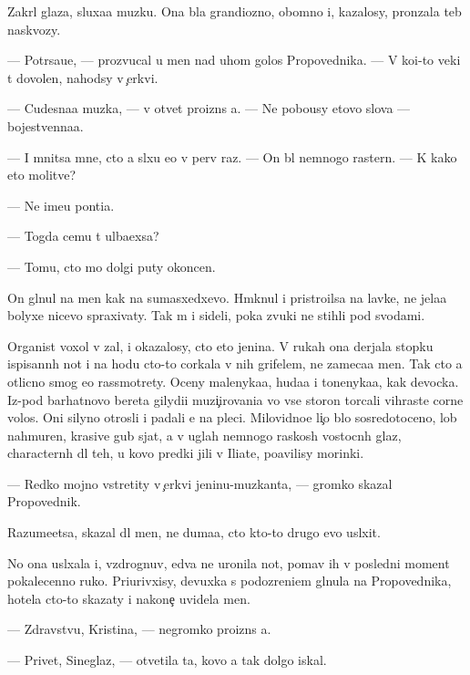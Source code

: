 \documentclass[10pt]{book}
\begin{document}
Zakr{\yi}l glaza, sluxa{\y}a muz{\yi}ku. Ona b{\yi}la grandiozno{\y}, ob{\y}omno{\y} i, kazalosy, pronzala teb{\ia} naskvozy.

— Potr{\ia}sa{\y}u{\x}e, — prozvucal u men{\ia} nad uhom golos Pro\-po\-ved\-nika. — V ko{\y}i-to veki t{\yi} do\-vo\-len, nahod{\ia}sy v {\c}erkvi.

— Cudesna{\y}a muz{\yi}ka, — v otvet proizn{\e}s {\y}a. — Ne pobo{\y}usy etovo slova — bojestvenna{\y}a.

— I mnitsa mne, cto {\y}a sl{\yi}xu {\y}e{\y}o v perv{\yi}{\y} raz. — On b{\yi}l nemnogo raster{\ia}n. — K kako{\y} eto molitve?

— Ne ime{\y}u pon{\ia}ti{\y}a.

— Togda cemu t{\yi} ul{\yi}ba{\y}exsa?

— Tomu, cto mo{\y} dolgi{\y} puty okoncen.

On gl{\ia}nul na men{\ia} kak na sumasxedxevo. Hm{\yi}knul i pristro{\y}ilsa na lavke, ne jela{\y}a bolyxe nicevo spraxivaty. Tak m{\yi} i sideli, poka zvuki ne stihli pod svodami.

Organist  voxol v zal, i okazalosy, cto eto jen{\x}ina. V rukah ona derjala stopku ispisann{\yi}h not i na hodu cto-to corkala v nih grifelem, ne zameca{\y}a men{\ia}. Tak cto {\y}a otlicno smog {\y}e{\y}o rassmotrety. Oceny malenyka{\y}a, huda{\y}a i tonenyka{\y}a, kak devocka. Iz-pod barhatnovo bereta gilydi{\y}i muzi{\c}irovani{\y}a vo vse storon{\yi} torcali vihrast{\yi}{\y}e corn{\yi}{\y}e volos{\yi}. Oni silyno otrosli i padali {\y}e{\y} na pleci. Milovidno{\y}e li{\c}o b{\yi}lo sosredotoceno, lob nahmuren, krasiv{\yi}{\y}e gub{\yi} sjat{\yi}, a v uglah nemnogo raskos{\yi}h vostocn{\yi}h glaz, charactern{\yi}h dl{\ia} teh, u kovo predki jili v Iliate, po{\y}avilisy mor{\x}inki.

— Redko mojno vstretity v {\c}erkvi jen{\x}inu-muz{\yi}kanta, — gromko skazal Pro\-po\-ved\-nik.

Razume{\y}etsa, skazal dl{\ia} men{\ia}, ne duma{\y}a, cto kto-to drugo{\y} {\y}evo usl{\yi}xit.

No ona usl{\yi}xala i, vzdrognuv, {\y}edva ne uronila not{\yi}, po{\y}mav ih v posledni{\y} moment pokalecenno{\y} ruko{\y}. Pri{\x}urivxisy, devuxka s podozreni{\y}em gl{\ia}nula na Pro\-po\-ved\-nika, hotela cto-to skazaty i na\-ko\-ne{\c} uvidela men{\ia}.

— Zdravstvu{\y}, Kristina, — negromko proizn{\e}s {\y}a.

— Privet, Sineglaz{\yi}{\y}, — otvetila ta, kovo {\y}a tak dolgo iskal.
\end{document}
